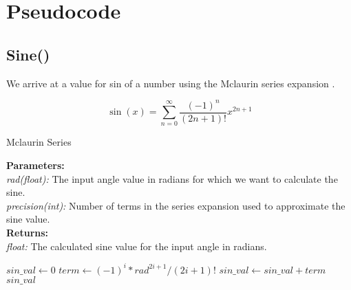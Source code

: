 \section{Pseudocode}
  \subsection{Sine()}
    \begin{flushleft}
    We arrive at a value for sin of a number using the Mclaurin series expansion \cite{doi:10.1137/1021091}.
    \end{flushleft}
    $$\sin(x) = \sum_{n=0}^{\infty} \frac{(-1)^n}{(2n+1)!}x^{2n+1}$$

    \begin{algorithm}
      \caption{Mclaurin Series}\label{Sin of}
      \begin{tabbing}
        \textbf{Parameters:}\\
        \hspace{1em}\textit{rad(float):} The input angle value in radians for which we want to calculate the sine.\\
        \hspace{1em}\textit{precision(int):} Number of terms in the series expansion used to approximate the sine value.\\
        
        \textbf{Returns:}\\
          \hspace{1em}\textit{float:} The calculated sine value for the input angle in radians.\\
      \end{tabbing}
      \begin{algorithmic}[1]
          \State $sin\_val \gets 0$ 
           
              \State $term \gets (-1)^i * rad^{2i+1} / (2i+1)!$ 
              \State $sin\_val \gets sin\_val + term$ 
          \EndFor
          \State \Return $sin\_val$
      \EndFunction
      \end{algorithmic}
    \end{algorithm}

